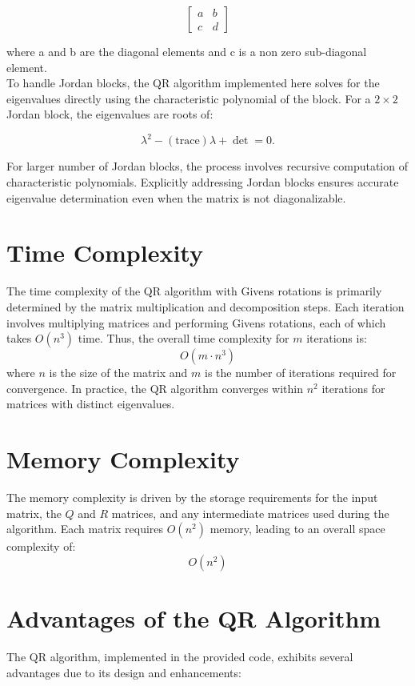 \documentclass[12pt]{article}
\begin{document}
\[
\begin{bmatrix}
a & b \\
c & d
\end{bmatrix}
\]

where a and b are the diagonal elements and c is a non zero sub-diagonal element.\\
To handle Jordan blocks, the QR algorithm implemented here solves for the eigenvalues directly using the characteristic polynomial of the block. For a \(2 \times 2\) Jordan block, the eigenvalues are roots of:

\[
\lambda^2 - (\text{trace})\lambda + \det = 0.
\]

For larger number of Jordan blocks, the process involves recursive computation of characteristic polynomials. Explicitly addressing Jordan blocks ensures accurate eigenvalue determination even when the matrix is not diagonalizable.

\section{Time Complexity}
The time complexity of the QR algorithm with Givens rotations is primarily determined by the matrix multiplication and decomposition steps. Each iteration involves multiplying matrices and performing Givens rotations, each of which takes \( O(n^3) \) time. Thus, the overall time complexity for \( m \) iterations is:
\[
O(m \cdot n^3)
\]
where \( n \) is the size of the matrix and \( m \) is the number of iterations required for convergence. In practice, the QR algorithm converges within \( n^2 \) iterations for matrices with distinct eigenvalues.

\section{Memory Complexity}
The memory complexity is driven by the storage requirements for the input matrix, the \( Q \) and \( R \) matrices, and any intermediate matrices used during the algorithm. Each matrix requires \( O(n^2) \) memory, leading to an overall space complexity of:
\[
O(n^2)
\]

\section{Advantages of the QR Algorithm}
The QR algorithm, implemented in the provided code, exhibits several advantages due to its design and enhancements:  
\end{document}

